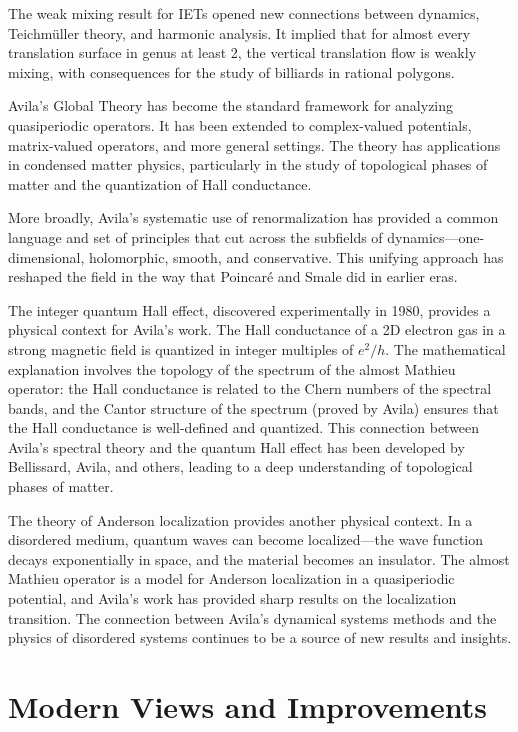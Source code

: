 The weak mixing result for IETs opened new connections between dynamics, Teichm\"{u}ller theory, and harmonic analysis. It implied that for almost every translation surface in genus at least 2, the vertical translation flow is weakly mixing, with consequences for the study of billiards in rational polygons.

Avila's Global Theory has become the standard framework for analyzing quasiperiodic operators. It has been extended to complex-valued potentials, matrix-valued operators, and more general settings. The theory has applications in condensed matter physics, particularly in the study of topological phases of matter and the quantization of Hall conductance.

More broadly, Avila's systematic use of renormalization has provided a common language and set of principles that cut across the subfields of dynamics---one-dimensional, holomorphic, smooth, and conservative. This unifying approach has reshaped the field in the way that Poincar\'{e} and Smale did in earlier eras.

The integer quantum Hall effect, discovered experimentally in 1980, provides a physical context for Avila's work. The Hall conductance of a 2D electron gas in a strong magnetic field is quantized in integer multiples of $e^2/h$. The mathematical explanation involves the topology of the spectrum of the almost Mathieu operator: the Hall conductance is related to the Chern numbers of the spectral bands, and the Cantor structure of the spectrum (proved by Avila) ensures that the Hall conductance is well-defined and quantized. This connection between Avila's spectral theory and the quantum Hall effect has been developed by Bellissard, Avila, and others, leading to a deep understanding of topological phases of matter.

The theory of Anderson localization provides another physical context. In a disordered medium, quantum waves can become localized---the wave function decays exponentially in space, and the material becomes an insulator. The almost Mathieu operator is a model for Anderson localization in a quasiperiodic potential, and Avila's work has provided sharp results on the localization transition. The connection between Avila's dynamical systems methods and the physics of disordered systems continues to be a source of new results and insights.

\section{Modern Views and Improvements}

